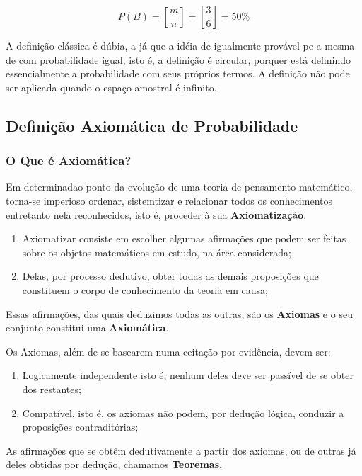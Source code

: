 $$
P(B)= \left[ \frac{m}{n} \right] = \left[ \frac{3}{6} \right] =  50\%
$$

A definição clássica é dúbia, a já que a idéia de igualmente provável pe a mesma de com probabilidade igual, isto é, a definição é circular, porquer está definindo essencialmente a probabilidade com seus próprios termos. A definição não pode ser aplicada quando o espaço amostral é infinito.


\subsection{Definição Axiomática de Probabilidade}
\subsubsection{O Que é Axiomática?}

Em determinadao ponto da evolução de uma teoria de pensamento matemático, torna-se imperioso ordenar, sistemtizar e relacionar todos os conhecimentos entretanto nela reconhecidos, isto é, proceder à sua \textbf{Axiomatização}. 
 
\begin{enumerate}
\item Axiomatizar consiste em escolher algumas afirmações que podem ser feitas sobre os objetos matemáticos em estudo, na área considerada;
\item Delas, por processo dedutivo, obter todas as demais proposições que constituem o corpo de conhecimento da teoria em causa;
\end{enumerate} 

Essas afirmações, das quais deduzimos todas as outras, são os \textbf{Axiomas} e o seu conjunto constitui uma \textbf{Axiomática}.\vskip0.3cm
 

Os Axiomas, além de se basearem numa ceitação por evidência, devem ser:

\begin{enumerate}
    \item Logicamente independente isto é, nenhum deles deve ser passível de se obter dos restantes;
    \item Compatível, isto é, os axiomas não podem, por dedução lógica, conduzir a proposições contraditórias; 
\end{enumerate}
 
As afirmações que se obtêm dedutivamente a partir dos axiomas, ou de outras já deles obtidas por dedução, chamamos \textbf{Teoremas}.\vskip0.3cm

